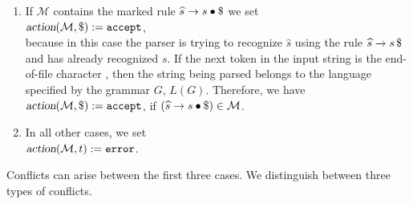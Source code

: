 \begin{enumerate}
      \\[0.2cm]
      \hspace*{1.3cm}
      \(\textsl{action}(\mathcal{M},t) := \langle \texttt{reduce}, a \rightarrow \beta \rangle\)
      \quad if 
      \((a \rightarrow \beta\mdot) \in \mathcal{M}\), \(a \neq \widehat{s}\) 
      and \(t \in \textsl{Follow}(a)\).
\item If \(\mathcal{M}\) contains the marked rule \(\widehat{s} \rightarrow s \mdot \symbol{36}\) we set
      \\[0.2cm]
      \hspace*{1.3cm}
      \(\textsl{action}(\mathcal{M},\symbol{36}) := \texttt{accept}\),
      \\[0.2cm]
      because in this case the parser is trying to recognize \(\widehat{s}\) using the rule \(\widehat{s} \rightarrow s\,\symbol{36}\)
      and has already recognized \(s\). If the next token in the input string 
      is the end-of-file character , 
      then the string being parsed belongs to the language specified by the grammar \(G\), 
      \(L(G)\). Therefore, we have
      \\[0.2cm]
      \hspace*{1.3cm}
      \(\textsl{action}(\mathcal{M},\symbol{36}) := \texttt{accept}\),
      \quad if \((\widehat{s} \rightarrow s\mdot\symbol{36}) \in \mathcal{M}\).
\item In all other cases, we set
      \\[0.2cm]
      \hspace*{1.3cm}
      \(\textsl{action}(\mathcal{M},t) := \texttt{error}\).
\end{enumerate}
Conflicts can arise between the first three cases. We distinguish between three types of conflicts.
